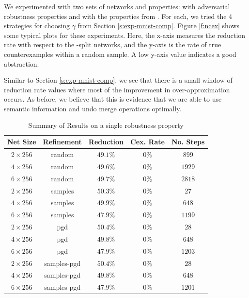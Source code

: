 We experimented with two sets of networks and properties: \mnist with
adversarial robustness properties and \acasxu with the properties from
\cite{reluplex}. For each, we tried the 4 strategies for choosing $\gamma$ from
Section \ref{s:exp-mnist-comp}.
Figure \ref{f:ncex} shows some typical plots
for these experiments. Here, the x-axis measures the reduction rate with respect
to the \inc-\dec split networks, and the y-axis is the rate of true
counterexamples within a random sample. A low y-axis value indicates a good
abstraction.

Similar to Section \ref{s:exp-mnist-comp}, we see that there is a small window
of reduction rate values where most of the improvement in over-approximation
occurs. As before, we believe that this is evidence that we are able to use
semantic information and undo merge operations optimally.

\begin{table}
\begin{tabular}{|c|c|c|c|c|}
    \hline
    Net Size     & Refinement  & Reduction & Cex. Rate & No. Steps \\
    \hline
    $2\times256$ & random      & $49.1\%$  & $  0\%$  & $ 899$    \\
    $4\times256$ & random      & $49.6\%$  & $  0\%$  & $1929$    \\
    $6\times256$ & random      & $49.7\%$  & $  0\%$  & $2818$    \\
    $2\times256$ & samples     & $50.3\%$  & $  0\%$  & $  27$    \\
    $4\times256$ & samples     & $49.9\%$  & $  0\%$  & $ 648$    \\
    $6\times256$ & samples     & $47.9\%$  & $  0\%$  & $1199$    \\
    $2\times256$ & pgd         & $50.4\%$  & $  0\%$  & $  28$    \\
    $4\times256$ & pgd         & $49.8\%$  & $  0\%$  & $ 648$    \\
    $6\times256$ & pgd         & $47.9\%$  & $  0\%$  & $1203$    \\
    $2\times256$ & samples-pgd & $50.4\%$  & $  0\%$  & $  28$    \\
    $4\times256$ & samples-pgd & $49.8\%$  & $  0\%$  & $ 648$    \\
    $6\times256$ & samples-pgd & $47.9\%$  & $  0\%$  & $1201$    \\
    \hline
\end{tabular}
\caption{Summary of \mnist Results on a single robustness property }
\label{t:mnist-prop-summary}
\end{table}

